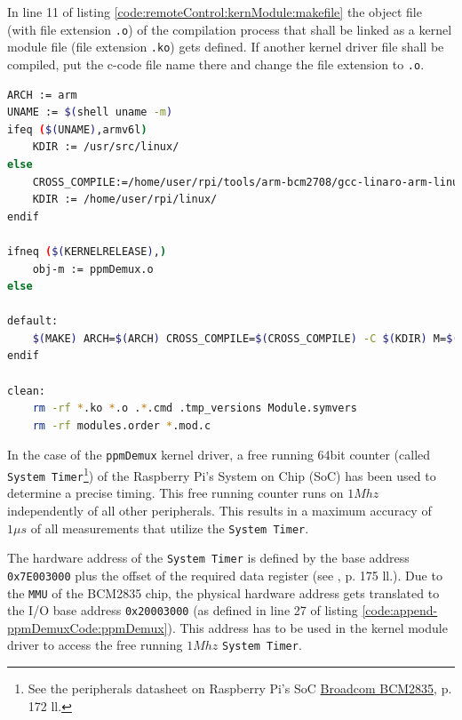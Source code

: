 In line 11 of listing \ref{code:remoteControl:kernModule:makefile} the object file (with file extension \texttt{.o}) of the compilation process that shall be linked as a kernel module file (file extension \texttt{.ko}) gets defined. If another kernel driver file shall be compiled, put the c-code file name there and change the file extension to \texttt{.o}.

\begin{lstlisting}[language=bash,caption={[Simple Makefile to compile a custom kernel driver]Simple Makefile to compile a custom kernel driver (here for the kernel module \texttt{ppmDemux})},label=code:remoteControl:kernModule:makefile,otherkeywords={ifeq,else,ifneq,endif,default,clean}]
ARCH := arm
UNAME := $(shell uname -m)
ifeq ($(UNAME),armv6l)
	KDIR := /usr/src/linux/
else
	CROSS_COMPILE:=/home/user/rpi/tools/arm-bcm2708/gcc-linaro-arm-linux-gnueabihf-raspbian-x64/bin/arm-linux-gnueabihf-
	KDIR := /home/user/rpi/linux/
endif

ifneq ($(KERNELRELEASE),)
	obj-m := ppmDemux.o
else

default:
	$(MAKE) ARCH=$(ARCH) CROSS_COMPILE=$(CROSS_COMPILE) -C $(KDIR) M=$(PWD) modules
endif

clean:
	rm -rf *.ko *.o .*.cmd .tmp_versions Module.symvers
	rm -rf modules.order *.mod.c
\end{lstlisting}
In the case of the \texttt{ppmDemux} kernel driver, a free running 64bit counter (called \texttt{System Timer}\footnote{See the peripherals datasheet on Raspberry Pi's SoC \href{https://www.raspberrypi.org/documentation/hardware/raspberrypi/bcm2835/BCM2835-ARM-Peripherals.pdf}{Broadcom BCM2835}, p. 172 ll. }) of the Raspberry Pi's System on Chip (SoC) has been used to determine a precise timing. This free running counter runs on $1Mhz$ independently of all other peripherals. This results in a maximum accuracy of $1\mu s$ of all measurements that utilize the \texttt{System Timer}.

The hardware address of the \texttt{System Timer} is defined by the base address \texttt{0x7E003000} plus the offset of the required data register (see \cite{doc:bcm2835}, p. 175 ll.). Due to the \texttt{MMU} of the BCM2835 chip, the physical hardware address gets translated to the I/O base address \texttt{0x20003000} (as defined in line 27 of listing \ref{code:append-ppmDemuxCode:ppmDemux}). This address has to be used in the kernel module driver to access the free running $1Mhz$ \texttt{System Timer}.

